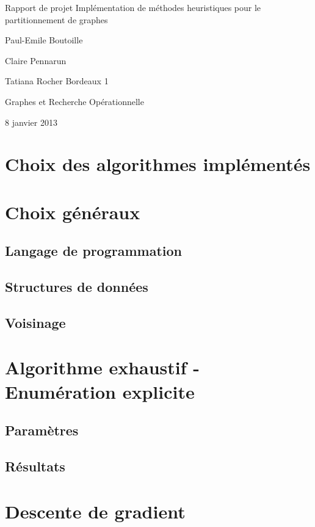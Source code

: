 \documentclass[12pt]{article}
\begin{document}
\begin{titlepage}
\begin{center}

\hfill
\vfill
\bigskip
\huge{Rapport de projet} 
\vfill
\bigskip 
\Huge 
\bigskip Implémentation de méthodes heuristiques pour le partitionnement de graphes \par 
\vfill
\Large Paul-Emile Boutoille \par
		Claire Pennarun \par 
		Tatiana Rocher
\vfill
\Large Bordeaux 1 \par \Large Graphes et Recherche Opérationnelle		
		\bigskip 
\bigskip

\Large
8 janvier 2013
\end{center}
\end{titlepage}

\section{Choix des algorithmes implémentés}

\section{Choix généraux}

\subsection{Langage de programmation}
\subsection{Structures de données}
\subsection{Voisinage}

\section{Algorithme exhaustif - Enumération explicite}
\subsection{Paramètres}
\subsection{Résultats}

\section{Descente de gradient}
\end{document}
